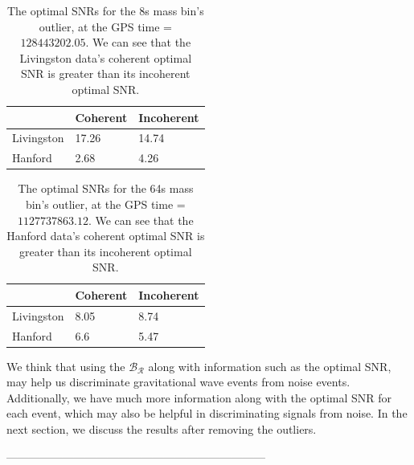 \documentclass{article}
\begin{document}
 \begin{table}[]
 	\centering
 	\caption{The optimal SNRs for the 8s mass bin's outlier, at the GPS time = $128443202.05$. We can see that the Livingston data's coherent optimal SNR is greater than its incoherent optimal SNR.}
 	\label{table:8s}
 	\begin{tabular}{|l|ll|}
 		\hline
 		& \textbf{Coherent} & \textbf{Incoherent} \\ \hline
 		Livingston & 17.26             & 14.74               \\
 		Hanford    & 2.68              & 4.26                \\ \hline
 	\end{tabular}
 \end{table}
 
 \begin{table}[]
 	\centering
 	\caption{The optimal SNRs for the 64s mass bin's outlier, at the GPS time = $1127737863.12$. We can see that the Hanford data's coherent optimal SNR is greater than its incoherent optimal SNR.}
 	\label{table:64s}
 	\begin{tabular}{|l|ll|}
 		\hline
 		& \textbf{Coherent} & \textbf{Incoherent} \\ \hline
 		Livingston & 8.05              & 8.74                \\
 		Hanford    & 6.6               & 5.47                \\ \hline
 	\end{tabular}
 \end{table}
 
 
 We think that using the $\mathcal{B_{R}}$ along with information such as the optimal SNR, may help us discriminate gravitational wave events from noise events. Additionally, we have much more information along with the optimal SNR for each event, which may also be helpful in discriminating signals from noise. In the next section, we discuss the results after removing the outliers.
 
 

 
 
 
 
---------------------------------------------------------------------
 
 
 
 
\end{document}
